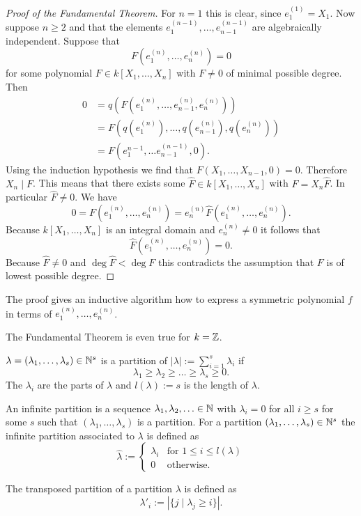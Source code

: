 \begin{proof}[Proof of the Fundamental Theorem]
  For $n = 1$ this is clear, since $e^{(1)}_1 = X_1$. Now suppose $n \geq 2$ and that the elements $e^{(n-1)}_1, \ldots, e^{(n-1)}_{n-1}$ are algebraically independent. Suppose that
  \[
   F\left(e^{(n)}_1, \ldots, e^{(n)}_n\right) = 0
  \]
  for some polynomial $F \in k[X_1, \ldots, X_n]$ with $F \neq 0$ of minimal possible degree. Then
  \begin{align*}
   0
   &= q\left(F\left(e^{(n)}_1, \ldots, e^{(n)}_{n-1} ,e^{(n)}_n\right)\right) \\
   &= F\left( q\left(e^{(n)}_1\right), \ldots, q\left(e^{(n)}_{n-1}\right), q\left(e^{(n)}_n\right) \right) \\
   &= F\left( e^{n-1}_1, \ldots e^{(n-1)}_{n-1}, 0 \right).
  \end{align*}
  Using the induction hypothesis we find that $F(X_1, \ldots, X_{n-1}, 0) = 0$. Therefore $X_n \mid F$. This means that there exists some $\hat{F} \in k[X_1, \ldots, X_n]$ with $F = X_n \hat{F}$. In particular $\hat{F} \neq 0$. We have
  \[
   0
   = F\left(e^{(n)}_1, \ldots, e^{(n)}_n\right)
   = e^{(n)}_n \hat{F}\left(e^{(n)}_1, \ldots, e^{(n)}_n\right).
  \]
  Because $k[X_1, \ldots, X_n]$ is an integral domain and $e^{(n)}_n \neq 0$ it follows that
  \[
   \hat{F}\left(e^{(n)}_1, \ldots, e^{(n)}_n\right) = 0.
  \]
  Because $\hat{F} \neq 0$ and $\deg \hat{F} < \deg F$ this contradicts the assumption that $F$ is of lowest possible degree.
\end{proof}


\begin{rem}
 The proof gives an inductive algorithm how to express a symmetric polynomial $f$ in terms of $e^{(n)}_1, \ldots, e^{(n)}_n$.
\end{rem}


\begin{rem}
 The Fundamental Theorem is even true for $k = \mathbb{Z}$.
\end{rem}


\begin{defi}
 $\lambda = (\lambda_1, \ldots, \lambda_s) \in \mathbb{N}^s$ is a partition of $|\lambda| := \sum_{i=1}^s \lambda_i$ if
 \[
  \lambda_1 \geq \lambda_2 \geq \ldots \geq \lambda_s \geq 0.
 \]
 The $\lambda_i$ are the parts of $\lambda$ and $l(\lambda) := s$ is the length of  $\lambda$.
 
 An infinite partition is a sequence $\lambda_1, \lambda_2, \ldots \in \mathbb{N}$ with $\lambda_i = 0$ for all $i \geq s$ for some $s$ such that $(\lambda_1, \ldots, \lambda_s)$ is a partition. For a partition $(\lambda_1, \ldots, \lambda_s) \in \mathbb{N}^s$ the infinite partition associated to $\lambda$ is defined as
 \[
  \hat{\lambda} :=
  \begin{cases}
   \lambda_i & \text{for } 1 \leq i \leq l(\lambda) \\
           0 & \text{otherwise}.
  \end{cases}
 \]
 
 The transposed partition of a partition $\lambda$ is defined as
 \[
  \lambda'_i := |\{j \mid \lambda_j \geq i\}|.
 \]
\end{defi}

